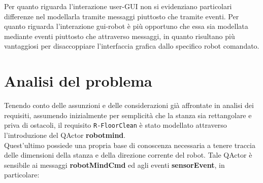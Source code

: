 \documentclass{llncs}
\newcommand{\code}[1]{{\color{blue}\small{\texttt{#1}}}}
\newcommand{\labelsec}[1]{\label{sec:#1}}
\begin{document}
Per quanto riguarda l'interazione user-GUI non si evidenziano particolari differenze nel modellarla tramite messaggi piuttosto che tramite eventi. 
Per quanto riguarda l'interazione gui-robot è più opportuno che essa sia modellata mediante eventi piuttosto che attraverso messaggi, in quanto risultano più vantaggiosi per disaccoppiare l'interfaccia grafica dallo specifico robot comandato. 


\section{Analisi del problema}
\labelsec{ProblemAnalysis}

Tenendo conto delle assunzioni e delle considerazioni già affrontate in analisi dei requisiti, assumendo inizialmente per semplicità che la stanza sia rettangolare e priva di ostacoli, il requisito \code{R-FloorClean} è stato modellato attraverso l'introduzione del QActor \textbf{robotmind}. \\ Quest'ultimo possiede una propria base di conoscenza necessaria a tenere traccia delle dimensioni della stanza e della direzione corrente del robot. Tale QActor è sensibile ai messaggi \textbf{robotMindCmd} ed agli eventi \textbf{sensorEvent}, in particolare:
\end{document}

